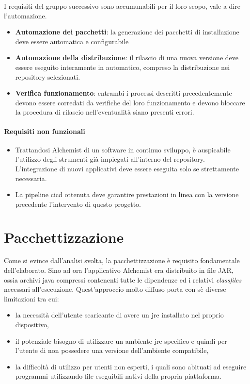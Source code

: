 I requisiti del gruppo successivo sono accumunabili per il loro scopo, vale a dire l'automazione.

\begin{itemize}
	\item \textbf{Automazione dei pacchetti}: la generazione dei pacchetti di installazione deve essere automatica e configurabile
	\item \textbf{Automazione della distribuzione}: il rilascio di una nuova versione deve essere eseguito interamente in automatico, compreso la distribuzione nei repository selezionati.
	\item \textbf{Verifica funzionamento}: entrambi i processi descritti precedentemente devono essere corredati da verifiche del loro funzionamento e devono bloccare la procedura di rilascio nell'eventualità siano presenti errori.
\end{itemize}

\paragraph{Requisiti non funzionali}

\begin{itemize}
	\item Trattandosi Alchemist di un software in continuo sviluppo, è auspicabile l'utilizzo degli strumenti già impiegati all'interno del repository. \\ L'integrazione di nuovi applicativi deve essere eseguita solo se strettamente necessaria.
	\item La pipeline \ac{cicd} ottenuta deve garantire prestazioni in linea con la versione precedente l'intervento di questo progetto.
\end{itemize}

\section{Pacchettizzazione}\label{sec:packaging}

Come si evince dall'analisi svolta, la pacchettizzazione è requisito fondamentale dell'elaborato. Sino ad ora l'applicativo Alchemist era distribuito in file JAR, ossia archivi java compressi contenenti tutte le dipendenze ed i relativi \textit{classfiles} necessari all'esecuzione. Quest'approccio molto diffuso porta con sè diverse limitazioni tra cui:
\begin{itemize}
	\item la necessità dell'utente scaricante di avere un \ac{jre} installato nel proprio dispositivo,
	\item il potenziale bisogno di utilizzare un ambiente \ac{jre} specifico e quindi per l'utente di non possedere una versione dell'ambiente compatibile,
	\item la difficoltà di utilizzo per utenti non esperti, i quali sono abituati ad eseguire programmi utilizzando file eseguibili nativi della propria piattaforma.
\end{itemize}

